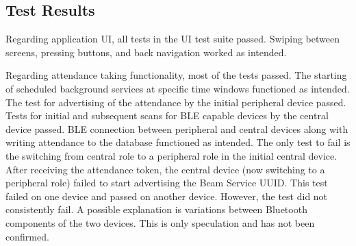 \documentclass[../report.tex]{subfiles}
\begin{document}
\subsection{Test Results}
Regarding application UI, all tests in the UI test suite passed. Swiping between screens, pressing buttons, and back navigation worked as intended. 

Regarding attendance taking functionality, most of the tests passed. The starting of scheduled background services at specific time windows functioned as intended. The test for advertising of the attendance by the initial peripheral device passed. Tests for initial and subsequent scans for BLE capable devices by the central device passed. BLE connection between peripheral and central devices along with writing attendance to the database functioned as intended. The only test to fail is the switching from central role to a peripheral role in the initial central device. After receiving the attendance token, the central device (now switching to a peripheral role) failed to start advertising the Beam Service UUID. This test failed on one device and passed on another device. However, the test did not consistently fail. A possible explanation is variations between Bluetooth components of the two devices. This is only speculation and has not been confirmed.  
\end{document}
